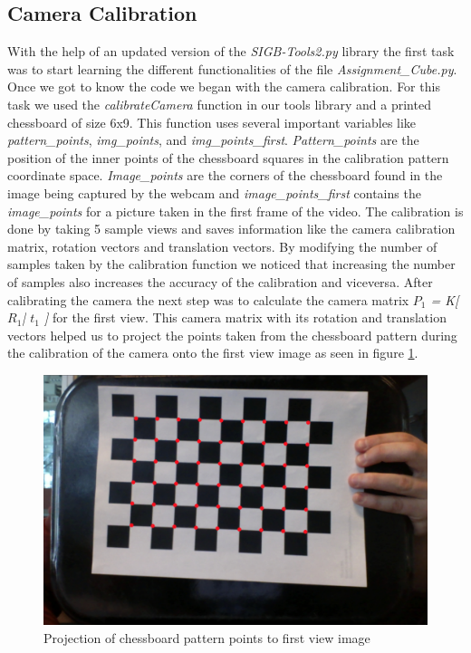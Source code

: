 \subsection{Camera Calibration}
With the help of an updated version of the \textsl{SIGB-Tools2.py} library the first task was to start learning the different functionalities of the file \textsl{Assignment\_Cube.py}. Once we got to know the code we began with the camera calibration. For this task we used the \textsl{calibrateCamera} function in our tools library and a printed chessboard of size 6x9. This function uses several important variables like \textsl{pattern\_points}, \textsl{img\_points}, and \textsl{img\_points\_first}. \textsl{Pattern\_points} are the position of the inner points of the chessboard squares in the calibration pattern coordinate space. \textsl{Image\_points} are the corners of the chessboard found in the image being captured by the webcam and \textsl{image\_points\_first} contains the \textsl{image\_points} for a picture taken in the first frame of the video. 
The calibration is done by taking 5 sample views and saves information like the camera calibration matrix, rotation vectors and translation vectors. By modifying the number of samples taken by the calibration function we noticed that increasing the number of samples also increases the accuracy of the calibration and viceversa.\newline 
After calibrating the camera the next step was to calculate the camera matrix  \textsl{ \(P_1\) = K[ \(R_1\)| \(t_1\) ]} for the first view. This camera matrix with its rotation and translation vectors helped us to project the points taken from the chessboard pattern during the calibration of the camera onto the first view image as seen in figure \ref{fig:projection}. 
\begin{figure}
	\centering
	\includegraphics[scale=0.3]{images/projection_p1.jpg}
	\caption{Projection of chessboard pattern points to first view image}
	\label{fig:projection}
\end{figure}

